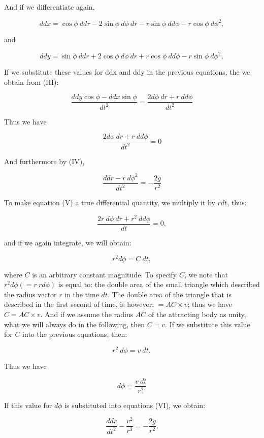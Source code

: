 \documentclass{article}
\begin{document}
And if we differentiate again,

$$
  ddx = \cos\phi\ ddr - 2\sin\phi\ d\phi\ dr - r\sin\phi\ dd\phi -r \cos\phi\ d\phi^{2},
$$

and

$$
  ddy = \sin\phi\ ddr + 2\cos\phi\ d\phi\ dr + r\cos\phi\ dd\phi - r\sin\phi\ d\phi ^{2} ,
$$

If we substitute these values for ddx and ddy in the previous equations, the we obtain from (III):

$$
  \frac{ddy\cos\phi - ddx\sin\phi }{dt^{2}} = \frac{2d\phi\ dr + r\ dd\phi}{dt^{2}}
$$

Thus we have

\begin{equation}
  \frac{2d\phi\ dr + r\ dd\phi }{dt^{2}}=0
\end{equation}

And furthermore by (IV),

\begin{equation}
  \frac{ddr-r\ d\phi^{2}}{dt^{2}} = -{\frac{2g}{r^{2}}}
\end{equation}

To make equation (V) a true differential quantity, we multiply it by $rdt$, thus:

$$
  \frac{2r\ d\phi\ dr + r^{2}\ dd\phi}{dt} = 0,
$$

and if we again integrate, we will obtain:

$$
  r^{2}d\phi =C\ dt,
$$

where $C$ is an arbitrary constant magnitude. To specify $C$, we note that $r^{2}d\phi (= r\ rd\phi)$ is equal to: the double area of the small triangle which described the radius vector $r$ in the time $dt$. The double area of the triangle that is described in the first second of time, is however: $= AC \times v$; thus we have $C = AC \times v$. And if we assume the radius $AC$ of the attracting body as unity, what we will always do in the following, then $C = v$. If we substitute this value for $C$ into the previous equations, then:

$$
  r^{2}\ d\phi =v\ dt,
$$

Thus we have

\begin{equation}
  d\phi = \frac{v\ dt}{r^{2}}
\end{equation}

If this value for $d\phi$ is substituted into equations (VI), we obtain:

$$
  \frac{ddr}{dt^{2}} - \frac{v^{2}}{r^{3}} = - \frac{2g}{r^{2}}.
$$
\end{document}
